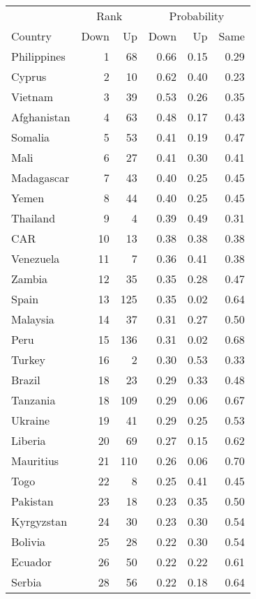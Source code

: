 
\begin{longtable}[t]{lrrrrr}
\toprule
\multicolumn{1}{c}{ } & \multicolumn{2}{c}{Rank} & \multicolumn{3}{c}{Probability} \\
\cmidrule(l{3pt}r{3pt}){2-3} \cmidrule(l{3pt}r{3pt}){4-6}
Country & Down & Up & Down & Up & Same\\
\midrule
Philippines & 1 & 68 & 0.66 & 0.15 & 0.29\\
Cyprus & 2 & 10 & 0.62 & 0.40 & 0.23\\
Vietnam & 3 & 39 & 0.53 & 0.26 & 0.35\\
Afghanistan & 4 & 63 & 0.48 & 0.17 & 0.43\\
Somalia & 5 & 53 & 0.41 & 0.19 & 0.47\\
\addlinespace
Mali & 6 & 27 & 0.41 & 0.30 & 0.41\\
Madagascar & 7 & 43 & 0.40 & 0.25 & 0.45\\
Yemen & 8 & 44 & 0.40 & 0.25 & 0.45\\
Thailand & 9 & 4 & 0.39 & 0.49 & 0.31\\
CAR & 10 & 13 & 0.38 & 0.38 & 0.38\\
\addlinespace
Venezuela & 11 & 7 & 0.36 & 0.41 & 0.38\\
Zambia & 12 & 35 & 0.35 & 0.28 & 0.47\\
Spain & 13 & 125 & 0.35 & 0.02 & 0.64\\
Malaysia & 14 & 37 & 0.31 & 0.27 & 0.50\\
Peru & 15 & 136 & 0.31 & 0.02 & 0.68\\
\addlinespace
Turkey & 16 & 2 & 0.30 & 0.53 & 0.33\\
Brazil & 18 & 23 & 0.29 & 0.33 & 0.48\\
Tanzania & 18 & 109 & 0.29 & 0.06 & 0.67\\
Ukraine & 19 & 41 & 0.29 & 0.25 & 0.53\\
Liberia & 20 & 69 & 0.27 & 0.15 & 0.62\\
\addlinespace
Mauritius & 21 & 110 & 0.26 & 0.06 & 0.70\\
Togo & 22 & 8 & 0.25 & 0.41 & 0.45\\
Pakistan & 23 & 18 & 0.23 & 0.35 & 0.50\\
Kyrgyzstan & 24 & 30 & 0.23 & 0.30 & 0.54\\
Bolivia & 25 & 28 & 0.22 & 0.30 & 0.54\\
\addlinespace
Ecuador & 26 & 50 & 0.22 & 0.22 & 0.61\\
Serbia & 28 & 56 & 0.22 & 0.18 & 0.64\\

\end{longtable}
